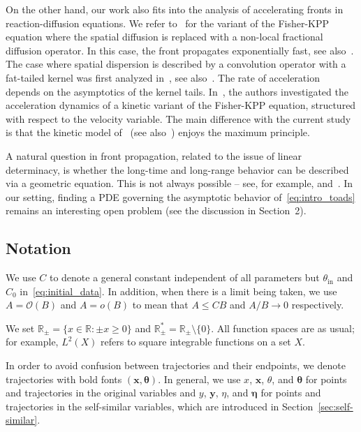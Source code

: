 \documentclass[AHL,Unicode,longabstracts]{cedram}
\newcommand{\rmin}{\mathrm{in}}
\newcommand{\R}{\mathbb{R}}
\newcommand{\bx}{\mathbf{x}}
\newcommand{\by}{\mathbf{y}}
\newcommand{\mO}{\mathcal{O}}
\newcommand{\btheta}{\boldsymbol{\theta}}
\newcommand{\beeta}{\boldsymbol{\eta}}
\newcommand{\1}{\mathds{1}}
\newcommand*{\MK}{\mkern 2mu}
\begin{document}
On the other hand, our work also fits into the analysis of accelerating fronts in reaction-diffusion equations. We refer to~\cite{CoulonRoquejoffre,CabreRoquejoffre} for the variant of the Fisher-KPP equation where the spatial diffusion is replaced with a non-local fractional diffusion operator. In this case, the front propagates exponentially fast, see also~\cite{mirrahimi_singular_2018,meleard_singular_2015}. The case where spatial dispersion is described by a convolution operator with a fat-tailed kernel was first analyzed in~\cite{Garnier}, see also~\cite{bouin_thin_2018}. The rate of acceleration depends on the asymptotics of the kernel tails. In~\cite{BouinCalvezNadin,bouin_large_2016}, the authors investigated the acceleration dynamics of a kinetic variant of the Fisher-KPP equation, structured with respect to the velocity variable. The main difference with the current study is that the kinetic model of~\cite{BouinCalvezNadin} (see also~\cite{cuesta_traveling_2012}) enjoys the maximum principle.


A natural question in front propagation, related to the issue of linear determinacy, is whether the long-time and long-range behavior can be described via a geometric equation. This is not always possible -- see, for example, \cite[Chapter~6.2]{Freidlin1} and~\cite[examples~B$\MK$(i) and B$\MK$(ii)]{MajdaSouganidis}. In our setting, finding a PDE governing the asymptotic behavior of~\eqref{eq:intro_toads} remains an interesting open problem (see the discussion in Section~2).



\subsection*{Notation}
We use $C$ to denote a general constant independent of all parameters but $\theta_{\rmin}$ and $C_0$ in~\eqref{eq:initial_data}. In addition, when there is a limit being taken, we use $A = \mO(B)$ and $A = o(B)$ to mean that $A \leq C B$ and $A/B \to 0$ respectively.

We set $\R_\pm = \{x \in \R : \pm x \geq 0\}$ and $\R_\pm^* = \R_\pm \setminus\{0\}$. All function spaces are as usual; for example, $L^2(X)$ refers to square integrable functions on a set $X$.

In order to avoid confusion between trajectories and their endpoints, we denote trajectories with bold fonts $(\bx,\btheta)$. In general, we use $x$, $\bx$, $\theta$, and $\btheta$ for points and trajectories in the original variables and $y$, $\by$, $\eta$, and $\beeta$ for points and trajectories in the self-similar variables, which are introduced in Section~\ref{sec:self-similar}.
\end{document}
